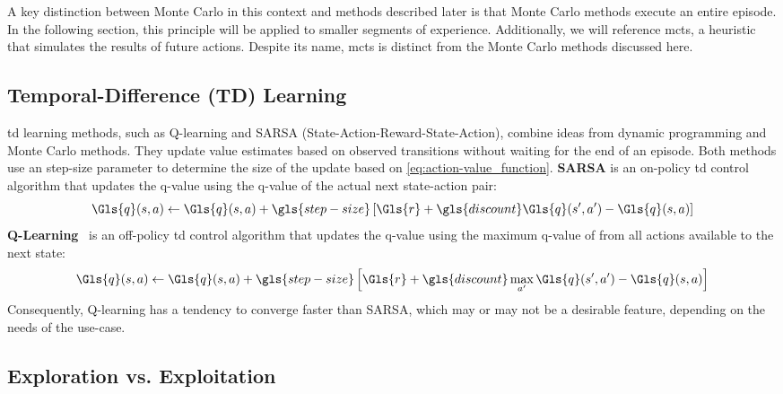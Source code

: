 A key distinction between Monte Carlo in this context and methods described 
later is that Monte Carlo methods execute an entire episode. In the following 
section, this principle will be applied to smaller segments of experience. 
Additionally, we will reference \gls{mcts}, 
a heuristic that simulates the results of future actions. Despite its name, 
\gls{mcts} is distinct from the Monte Carlo methods discussed here.

    \subsection*{Temporal-Difference (TD) Learning}%

\Gls{td} learning methods, such as Q-learning and SARSA 
(State-Action-Reward-State-Action), combine ideas from 
dynamic programming and Monte Carlo methods. They update value estimates 
based on observed transitions without waiting for the end of an episode.
Both methods use an \gls{step-size} parameter to determine the size of 
the update based on \cref{eq:action-value_function}.
%
\textbf{SARSA} is an on-policy \gls{td} control algorithm that updates the 
\Gls{q}-value using the \Gls{q}-value of the actual next state-action pair:
%
\begin{equation}
    \Gls{q}(s, a) \leftarrow \Gls{q}(s, a) + \gls{step-size} \left[ 
        \Gls{r} + \gls{discount} \Gls{q}(s^\prime, a^\prime) - \Gls{q}(s, a) 
    \right]
    \label{eq:sarsa_action-value}
\end{equation}
%
\textbf{Q-Learning}~\cite{watkins1992} is an off-policy \gls{td} control 
algorithm that updates the \Gls{q}-value using the maximum \Gls{q}-value of 
from all actions available to the next state:
%
\begin{equation}
    \Gls{q}(s, a) \leftarrow \Gls{q}(s, a) + \gls{step-size} \left[ 
        \Gls{r} + \gls{discount} \max_{a^\prime} 
        \Gls{q}(s^\prime, a^\prime) - \Gls{q}(s, a)
    \right]
    \label{eq:q-learning_action-value}
\end{equation}
%
Consequently, Q-learning has a tendency to converge faster than SARSA,
which may or may not be a desirable feature, depending on the needs
of the use-case.

    \subsection*{Exploration vs. Exploitation}

